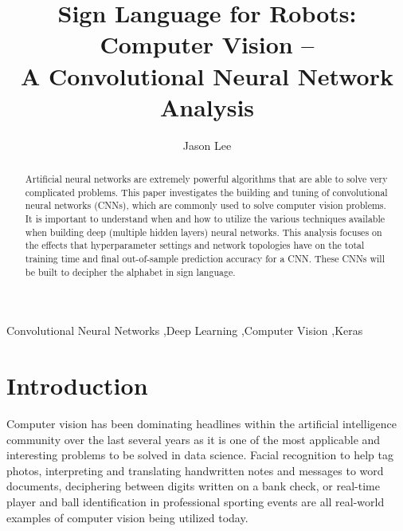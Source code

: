 \documentclass[5p,authoryear]{elsarticle}
\begin{document}
\begin{frontmatter}

\title{Sign Language for Robots: Computer Vision –\\ A Convolutional Neural Network Analysis}
\author{Jason Lee}
\address{Northwestern University, SPS \\Artificial Intelligence and Deep Learning \\2019FA MSDS 458-56}


\begin{abstract}

Artificial neural networks are extremely powerful algorithms that are able to solve very complicated problems. This paper investigates the building and tuning of convolutional neural networks (CNNs), which are commonly used to solve computer vision problems. It is important to understand when and how to utilize the various techniques available when building deep (multiple hidden layers) neural networks. This analysis focuses on the effects that hyperparameter settings and network topologies have on the total training time and final out-of-sample prediction accuracy for a CNN. These CNNs will be built to decipher the alphabet in sign language.


\end{abstract}


\begin{keyword}
Convolutional Neural Networks \sep Deep Learning \sep Computer Vision \sep Keras\end{keyword}

\end{frontmatter}



\section{Introduction}\label{introduction}

Computer vision has been dominating headlines within the artificial intelligence community over the last several years as it is one of the most applicable and interesting problems to be solved in data science. Facial recognition to help tag photos, interpreting and translating handwritten notes and messages to word documents, deciphering between digits written on a bank check, or real-time player and ball identification in professional sporting events are all real-world examples of computer vision being utilized today. 
\end{document}
